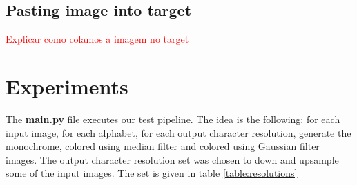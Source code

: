\documentclass[]{IEEEtran}
\newcommand\todolist[1]{\textcolor{red}{#1}}
\begin{document}
\subsection{Pasting image into target}
\todolist{Explicar como colamos a imagem no target}





\section{Experiments}
The \textbf{main.py} file executes our test pipeline. The idea is the following: for each input image, for each alphabet, for each output character resolution, generate the monochrome, colored using median filter and colored using Gaussian filter images.
The output character resolution set was chosen to down and upsample some of the input images. The set is given in table \ref{table:resolutions}
\end{document}

